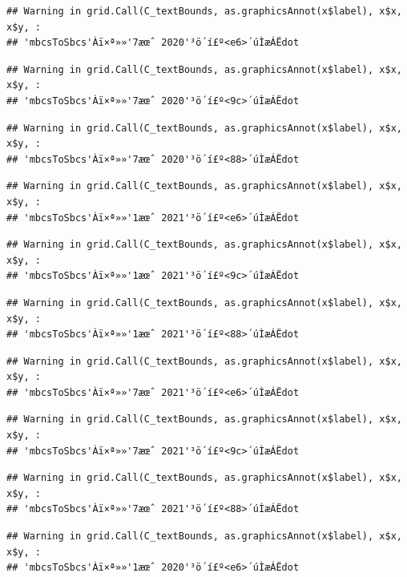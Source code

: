 \documentclass[
]{book}
\begin{document}
\begin{verbatim}
## Warning in grid.Call(C_textBounds, as.graphicsAnnot(x$label), x$x, x$y, :
## 'mbcsToSbcs'Àï×ª»»'7æœˆ 2020'³ö´í£º<e6>´úÌæÁËdot
\end{verbatim}

\begin{verbatim}
## Warning in grid.Call(C_textBounds, as.graphicsAnnot(x$label), x$x, x$y, :
## 'mbcsToSbcs'Àï×ª»»'7æœˆ 2020'³ö´í£º<9c>´úÌæÁËdot
\end{verbatim}

\begin{verbatim}
## Warning in grid.Call(C_textBounds, as.graphicsAnnot(x$label), x$x, x$y, :
## 'mbcsToSbcs'Àï×ª»»'7æœˆ 2020'³ö´í£º<88>´úÌæÁËdot
\end{verbatim}

\begin{verbatim}
## Warning in grid.Call(C_textBounds, as.graphicsAnnot(x$label), x$x, x$y, :
## 'mbcsToSbcs'Àï×ª»»'1æœˆ 2021'³ö´í£º<e6>´úÌæÁËdot
\end{verbatim}

\begin{verbatim}
## Warning in grid.Call(C_textBounds, as.graphicsAnnot(x$label), x$x, x$y, :
## 'mbcsToSbcs'Àï×ª»»'1æœˆ 2021'³ö´í£º<9c>´úÌæÁËdot
\end{verbatim}

\begin{verbatim}
## Warning in grid.Call(C_textBounds, as.graphicsAnnot(x$label), x$x, x$y, :
## 'mbcsToSbcs'Àï×ª»»'1æœˆ 2021'³ö´í£º<88>´úÌæÁËdot
\end{verbatim}

\begin{verbatim}
## Warning in grid.Call(C_textBounds, as.graphicsAnnot(x$label), x$x, x$y, :
## 'mbcsToSbcs'Àï×ª»»'7æœˆ 2021'³ö´í£º<e6>´úÌæÁËdot
\end{verbatim}

\begin{verbatim}
## Warning in grid.Call(C_textBounds, as.graphicsAnnot(x$label), x$x, x$y, :
## 'mbcsToSbcs'Àï×ª»»'7æœˆ 2021'³ö´í£º<9c>´úÌæÁËdot
\end{verbatim}

\begin{verbatim}
## Warning in grid.Call(C_textBounds, as.graphicsAnnot(x$label), x$x, x$y, :
## 'mbcsToSbcs'Àï×ª»»'7æœˆ 2021'³ö´í£º<88>´úÌæÁËdot
\end{verbatim}

\begin{verbatim}
## Warning in grid.Call(C_textBounds, as.graphicsAnnot(x$label), x$x, x$y, :
## 'mbcsToSbcs'Àï×ª»»'1æœˆ 2020'³ö´í£º<e6>´úÌæÁËdot
\end{verbatim}
\end{document}
